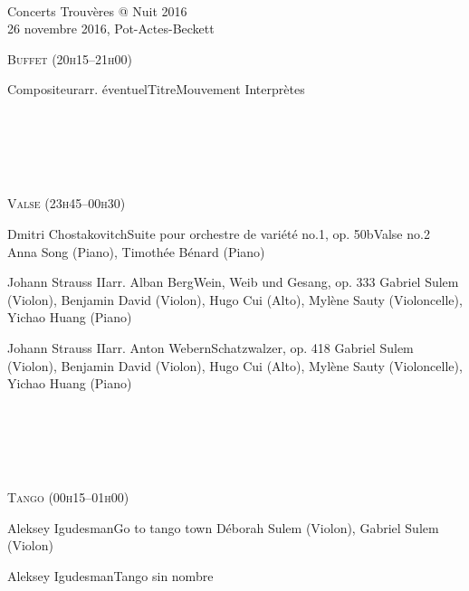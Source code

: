 \documentclass[a4paper,11pt,poets,durations]{ConcProg}
\begin{document}
{
\selectfont

~\\

\begin{programme}{
    Concerts Trouvères @ Nuit 2016
\\  {\normalsize 26 novembre 2016, Pot-Actes-Beckett}
}
~\\
\begin{center}
\textsc{Buffet (20h15--21h00)}
\end{center}
  \begin{part}[]
    \begin{composition}{Compositeur}{arr. éventuel}{Titre}{Mouvement}
      {\small Interprètes}
    \end{composition}\\
~\\
~\\
~\\
\begin{center}
\textsc{Valse (23h45--00h30)}
\end{center}
    \begin{composition}{Dmitri Chostakovitch}{}{Suite pour orchestre de variété no.1, op. 50b}{Valse no.2}
      {\small Anna Song (Piano), Timothée Bénard (Piano)}
    \end{composition}
    \begin{composition}{Johann Strauss II}{arr. Alban Berg}{Wein, Weib und Gesang, op. 333}{}
      {\small Gabriel Sulem (Violon), Benjamin David (Violon), Hugo Cui (Alto), Mylène Sauty (Violoncelle), Yichao Huang (Piano)}
    \end{composition}
    \begin{composition}{Johann Strauss II}{arr. Anton Webern}{Schatzwalzer, op. 418}{}
      {\small Gabriel Sulem (Violon), Benjamin David (Violon), Hugo Cui (Alto), Mylène Sauty (Violoncelle), Yichao Huang (Piano)}
    \end{composition}\\
~\\
~\\
~\\
\begin{center}
\textsc{Tango (00h15--01h00)}
\end{center}
    \begin{composition}{Aleksey Igudesman}{}{Go to tango town}{}
      {\small Déborah Sulem (Violon), Gabriel Sulem (Violon)}
    \end{composition}
    \begin{composition}{Aleksey Igudesman}{}{Tango sin nombre}{}

\end{composition}
\end{part}
\end{programme}}
\end{document}
